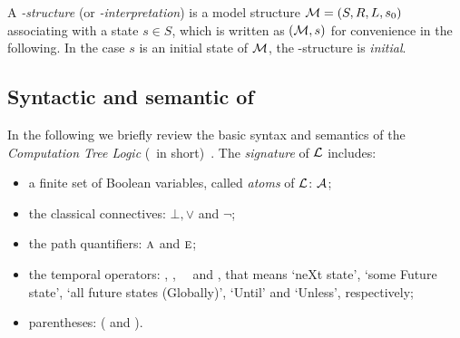 \documentclass[letterpaper]{article} %
\begin{document}
A {\em \MPK-structure} (or {\em \MPK-interpretation}) is a model structure
${\cal M}=(S, R, L, s_0)$ associating
with a state $s\in S$, which is written as $({\cal M},s)$ for convenience in the following.
In the case $s$ is an initial state of $\cal M$, the \MPK-structure is {\em initial}.


\subsection{Syntactic and semantic of \CTL}
In the following we briefly review the basic syntax and semantics
of the {\em Computation Tree Logic}
(\CTL\ in short)~\cite{DBLP:journals/toplas/ClarkeES86}. %
%
The {\em signature} of $\cal L$ includes:
\begin{itemize}
  \item a finite set of Boolean variables, called {\em atoms} of $\cal L$: $\cal A$;
  \item the classical connectives: $\bot,\lor$ and $\neg$;
  \item the path quantifiers: $\textsc{a}$ and $\textsc{e}$;
  \item the temporal operators: \NEXT, \FUTURE, \GLOBAL\, \UNTIL\ and \UNLESS, that
  means `neXt state', `some Future state', `all future states (Globally)', `Until' and `Unless', respectively;
  \item parentheses: ( and ).
\end{itemize}
\end{document}
